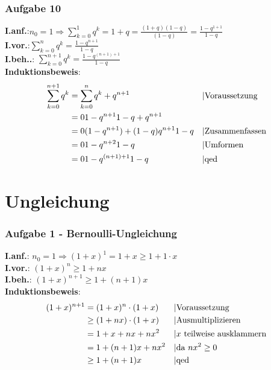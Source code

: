 \subsubsection{Aufgabe 10}
\textbf{I.anf.}:\quad $ n_0 = 1 \Rightarrow \sum_{k=0}^1 q^k = 1 + q = \frac{(1+q)(1-q)}{(1-q)} = \frac{1-q^{1+1}}{1-q}$\\ 
\textbf{I.vor.}:\quad $\sum_{k=0}^n q^k = \frac{1 - q^{n+1}}{1 - q} $\\
\textbf{I.beh..}: \quad $\sum_{k=0}^{n+1} q^k = \frac{1 - q^{(n+1)+1}}{1 - q} $\\
\textbf{Induktionsbeweis}:\begin{align*} 
\sum_{k=0}^{n+1} q^k &= \sum_{k=0}^n q^k + q^{n+1} && \text{\textbar Voraussetzung}\\
											&= \frac{1 - q^{n+1}}{1 - q} + q^{n+1} \\
											&= \frac{(1 - q^{n+1}) + (1-q)q^{n+1}}{1 - q} && \text{\textbar Zusammenfassen}\\
											&= \frac{1 - q^{n+2}}{1 - q} && \text{\textbar Umformen}\\
											&= \frac{1 - q^{(n+1)+1}}{1 - q}&& \text{\textbar qed}\end{align*}
\section{Ungleichung}
\subsubsection{Aufgabe 1 - Bernoulli-Ungleichung}
\textbf{I.anf.}: $ n_0 = 1 \Rightarrow (1+x)^1 = 1 + x \geq 1+1\cdot x $\\
\textbf{I.vor.}: $ (1 + x)^n \geq 1 + nx $\\
\textbf{I.beh.}: $ (1 + x)^{n+1} \geq 1 + (n+1)x $\\
\textbf{Induktionsbeweis}: \begin{align*}
(1 + x)^{n+1} &= (1 + x)^n \cdot (1 + x) 				 && \text{\textbar Voraussetzung}\\
							&\geq (1 + nx) \cdot (1 + x) 				 && \text{\textbar Ausmultiplizieren}\\
							&= 1 + x + nx + nx^2 					 && \text{\textbar $x$ teilweise ausklammern}\\
							&= 1 + (n+1)x + nx^2 					 && \text{\textbar da $nx^2 \geq 0$}\\
							&\geq 1 + (n+1)x 							 && \text{\textbar qed}\end{align*}	
